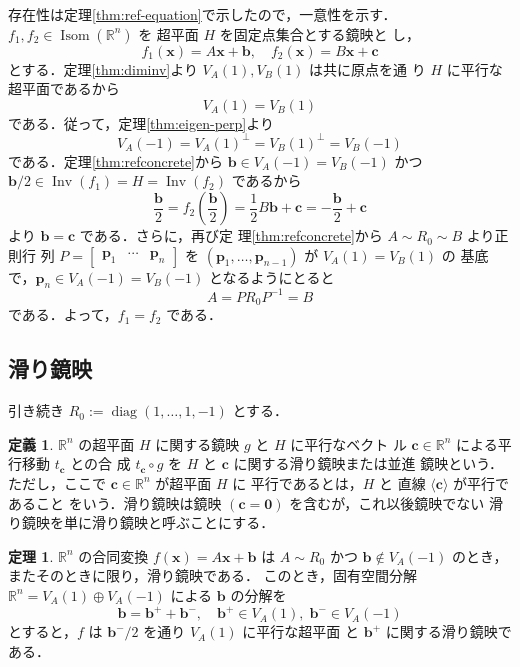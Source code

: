 \documentclass[11pt, uplatex, dvipdfmx, titlepage]{jsarticle}
\makeatletter
\DeclareMathOperator{\Isom}{Isom}
\DeclareMathOperator{\Inv}{Inv}
\DeclareMathOperator{\diag}{diag}
\renewenvironment{proof}[1][\proofname]{\par
  \pushQED{\qed}%
  \normalfont \topsep6\p@\@plus6\p@\relax
  \trivlist
  \item[\hskip\labelsep
         \bfseries
    {#1}]\ignorespaces
}{%
  \popQED\endtrivlist\@endpefalse
}
\theoremstyle{definition}
\newtheorem{theorem}{定理}[section]
\newtheorem*{definition}{定義}
\renewcommand{\proofname}{\textbf{証明}}
\makeatother
\begin{document}
\begin{proof}
  
  存在性は定理\ref{thm:ref-equation}で示したので，一意性を示す．$f_1,
  f_2 \in \Isom(\mathbb{R}^n)$ を 超平面 $H$ を固定点集合とする鏡映と
  し，
  \[
    f_1(\bm{x}) = A\bm{x} + \bm{b}, \quad f_2(\bm{x}) = B\bm{x} + \bm{c}
  \]
  とする．定理\ref{thm:diminv}より $V_A(1), V_B(1)$ は共に原点を通
  り $H$ に平行な超平面であるから
  \[
    V_A(1) = V_B(1)
  \]
  である．従って，定理\ref{thm:eigen-perp}より
  \[
    V_A(-1) = V_A(1)^{\perp} = V_B(1)^{\perp} = V_B(-1)
  \]
  である．定理\ref{thm:refconcrete}から $\bm{b} \in
  V_A(-1) = V_B(-1)$ かつ $\bm{b}/2 \in \Inv(f_1) = H = \Inv(f_2)$ であるから
  \[
    \frac{\bm{b}}{2} = f_2\left( \frac{\bm{b}}{2}\right) = \frac{1}{2} B \bm{b} + \bm{c} 
    = -\frac{\bm{b}}{2} + \bm{c} 
  \]
  より $\bm{b} = \bm{c}$ である．さらに，再び定
  理\ref{thm:refconcrete}から $A \sim R_0 \sim B$ より正則行
  列 $P=\left[
    \begin{array}{ccc}
      \bm{p}_1 & \cdots & \bm{p}_n
    \end{array}
  \right]$ を $(\bm{p}_1, \ldots, \bm{p}_{n-1})$ が $V_A(1)=V_B(1)$ の
  基底で，$\bm{p}_n \in V_A(-1)=V_B(-1)$ となるようにとると
  \[
    A= P R_0 P^{-1}  = B
  \]
  である．よって，$f_1 = f_2$ である．
\end{proof}

\subsection{滑り鏡映}\label{sec:glide}

引き続き $R_0:=\diag(1,\ldots, 1,-1)$ とする．

\begin{definition}
  $\mathbb{R}^n$ の超平面 $H$ に関する鏡映 $g$ と $H$ に平行なベクト
  ル $\bm{c} \in \mathbb{R}^n$ による平行移動 $t_{\bm{c}}$ との合
  成 $t_{\bm{c}} \circ g$ を $H$ と $\bm{c}$ に関する滑り鏡映または並進
  鏡映という．ただし，ここで $\bm{c} \in \mathbb{R}^n$ が超平面 $H$ に
  平行であるとは，$H$ と 直線 $\langle \bm{c} \rangle$ が平行であること
  をいう．滑り鏡映は鏡映 $(\bm{c}=\bm{0})$ を含むが，これ以後鏡映でない
  滑り鏡映を単に滑り鏡映と呼ぶことにする．
\end{definition}


\begin{theorem}\label{thm:glide}
  $\mathbb{R}^n$ の合同変換 $f(\bm{x}) = A\bm{x} + \bm{b}$ は $A \sim R_0$ かつ
  $\bm{b} \notin V_A(-1)$ のとき，またそのときに限り，滑り鏡映である．
  このとき，固有空間分解 $\mathbb{R}^n = V_A(1) \oplus V_A(-1)$ による $\bm{b}$ の分解を
  \begin{equation}\label{eq:eigendecomp-gen}
    \bm{b} = \bm{b}^{+} + \bm{b}^{-}, \quad \bm{b}^{+} \in V_A(1), \; \bm{b}^{-} \in V_A(-1)
  \end{equation}
  とすると，$f$ は $\bm{b}^{-}/2$ を通り $V_A(1)$ に平行な超平面
  と $\bm{b}^{+}$ に関する滑り鏡映である．
\end{theorem}
\end{document}
